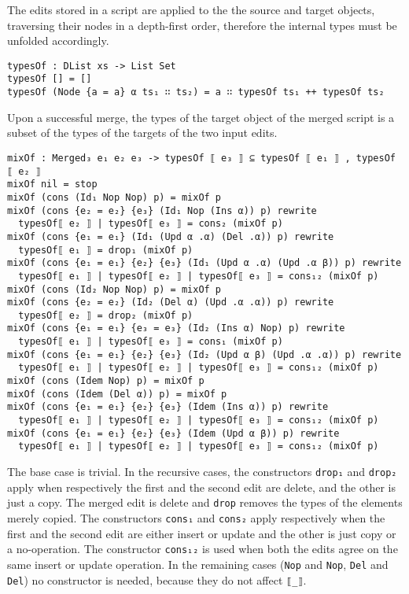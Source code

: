 \documentclass[../Thesis.tex]{subfiles}
\begin{document}
	The edits stored in a script are applied to the the source and 
	target objects, traversing their nodes in a depth-first order, 
	therefore the internal types must be unfolded accordingly.
	
\begin{verbatim}
typesOf : DList xs -> List Set
typesOf [] = []
typesOf (Node {a = a} α ts₁ ∷ ts₂) = a ∷ typesOf ts₁ ++ typesOf ts₂
\end{verbatim}

	Upon a successful merge, the types of the target object of the merged script
	is a subset of the types of the targets of the two input edits.
\begin{verbatim}	
mixOf : Merged₃ e₁ e₂ e₃ -> typesOf ⟦ e₃ ⟧ ⊆ typesOf ⟦ e₁ ⟧ , typesOf ⟦ e₂ ⟧
mixOf nil = stop
mixOf (cons (Id₁ Nop Nop) p) = mixOf p
mixOf (cons {e₂ = e₂} {e₃} (Id₁ Nop (Ins α)) p) rewrite
  typesOf⟦ e₂ ⟧ | typesOf⟦ e₃ ⟧ = cons₂ (mixOf p)
mixOf (cons {e₁ = e₁} (Id₁ (Upd α .α) (Del .α)) p) rewrite
  typesOf⟦ e₁ ⟧ = drop₁ (mixOf p)
mixOf (cons {e₁ = e₁} {e₂} {e₃} (Id₁ (Upd α .α) (Upd .α β)) p) rewrite
  typesOf⟦ e₁ ⟧ | typesOf⟦ e₂ ⟧ | typesOf⟦ e₃ ⟧ = cons₁₂ (mixOf p)
mixOf (cons (Id₂ Nop Nop) p) = mixOf p
mixOf (cons {e₂ = e₂} (Id₂ (Del α) (Upd .α .α)) p) rewrite
  typesOf⟦ e₂ ⟧ = drop₂ (mixOf p)
mixOf (cons {e₁ = e₁} {e₃ = e₃} (Id₂ (Ins α) Nop) p) rewrite
  typesOf⟦ e₁ ⟧ | typesOf⟦ e₃ ⟧ = cons₁ (mixOf p)
mixOf (cons {e₁ = e₁} {e₂} {e₃} (Id₂ (Upd α β) (Upd .α .α)) p) rewrite
  typesOf⟦ e₁ ⟧ | typesOf⟦ e₂ ⟧ | typesOf⟦ e₃ ⟧ = cons₁₂ (mixOf p)
mixOf (cons (Idem Nop) p) = mixOf p
mixOf (cons (Idem (Del α)) p) = mixOf p
mixOf (cons {e₁ = e₁} {e₂} {e₃} (Idem (Ins α)) p) rewrite 
  typesOf⟦ e₁ ⟧ | typesOf⟦ e₂ ⟧ | typesOf⟦ e₃ ⟧ = cons₁₂ (mixOf p)
mixOf (cons {e₁ = e₁} {e₂} {e₃} (Idem (Upd α β)) p) rewrite 
  typesOf⟦ e₁ ⟧ | typesOf⟦ e₂ ⟧ | typesOf⟦ e₃ ⟧ = cons₁₂ (mixOf p)
\end{verbatim}

	The base case is trivial.
	In the recursive cases, the constructors \texttt{drop₁} and \texttt{drop₂} 
	apply when respectively the first and the second edit are delete, and the
	other is just a copy. The merged edit is delete and \texttt{drop} removes
	the types of the elements merely copied.
	The constructors \texttt{cons₁} and \texttt{cons₂} apply respectively
	when the first and the second edit are either insert or update and the other
	is just copy or a no-operation.
	The constructor \texttt{cons₁₂} is used when both the edits agree on the
	same insert or update operation. In the remaining cases (\texttt{Nop} and 
	\texttt{Nop}, \texttt{Del} and \texttt{Del}) no constructor is needed, because
	they do not affect \texttt{⟦\_⟧}.
	
\end{document}
